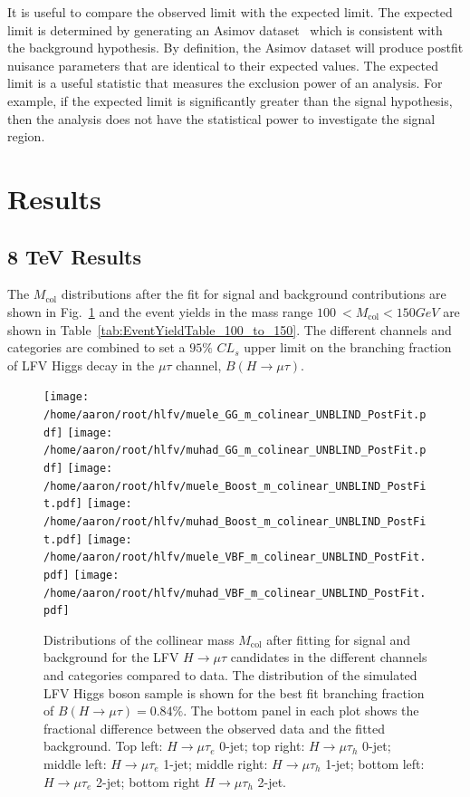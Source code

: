 \documentclass[oneside, letterpaper, oldfontcommands]{memoir}
\begin{document}
\qquad It is useful to compare the observed limit with the expected limit. The expected limit is determined by generating an Asimov dataset~\cite{Cowan:2010js} which is consistent with the background hypothesis. By definition, the Asimov dataset will produce postfit nuisance parameters that are identical to their expected values. The expected limit is a useful statistic that measures the exclusion power of an analysis. For example, if the expected limit is significantly greater than the signal hypothesis, then the analysis does not have the statistical power to investigate the signal region. 
\section{Results}
\subsection{8 TeV Results}\label{8tevresults}
The $M_\text{col}$ distributions after the fit for signal and background contributions are shown in Fig.~\ref{fig:Mcol_Postfit} and the
event yields in the mass range $100\:  < M_\text{col} < 150GeV$ are shown in Table~\ref{tab:EventYieldTable_100_to_150}.
The different channels and categories are combined  to set a $95\%$ $CL_{s}$  upper limit on the branching
fraction of LFV Higgs decay in the  $\mu \tau$ channel, $B(H\rightarrow\mu\tau)$.

\begin{figure}[hbtp]\centering
 \texttt{[image: /home/aaron/root/hlfv/muele\_GG\_m\_colinear\_UNBLIND\_PostFit.pdf]}
 \texttt{[image: /home/aaron/root/hlfv/muhad\_GG\_m\_colinear\_UNBLIND\_PostFit.pdf]}
 \texttt{[image: /home/aaron/root/hlfv/muele\_Boost\_m\_colinear\_UNBLIND\_PostFit.pdf]}
 \texttt{[image: /home/aaron/root/hlfv/muhad\_Boost\_m\_colinear\_UNBLIND\_PostFit.pdf]}
 \texttt{[image: /home/aaron/root/hlfv/muele\_VBF\_m\_colinear\_UNBLIND\_PostFit.pdf]}
 \texttt{[image: /home/aaron/root/hlfv/muhad\_VBF\_m\_colinear\_UNBLIND\_PostFit.pdf]}
 \caption{Distributions of the collinear mass $M_\text{col}$ after fitting for signal and background  for the LFV $H \rightarrow \mu \tau$ candidates in
the different
channels and categories compared to data.
The distribution of the simulated LFV Higgs boson sample is shown for the best fit branching fraction
of $B(H \rightarrow \mu \tau )=0.84\%$.
The bottom panel in each plot shows the fractional difference between the observed data and the fitted background. Top left: $H \rightarrow \mu \tau_{e}$ 0-jet; top right: $H \rightarrow \mu \tau_{h}$ 0-jet;
middle left: $H \rightarrow \mu \tau_{e}$ 1-jet; middle right: $H \rightarrow \mu \tau_{h}$ 1-jet; bottom left: $H \rightarrow \mu \tau_{e}$ 2-jet; bottom right $H \rightarrow \mu \tau_{h}$ 2-jet.}
 \label{fig:Mcol_Postfit}\end{figure}
\end{document}
